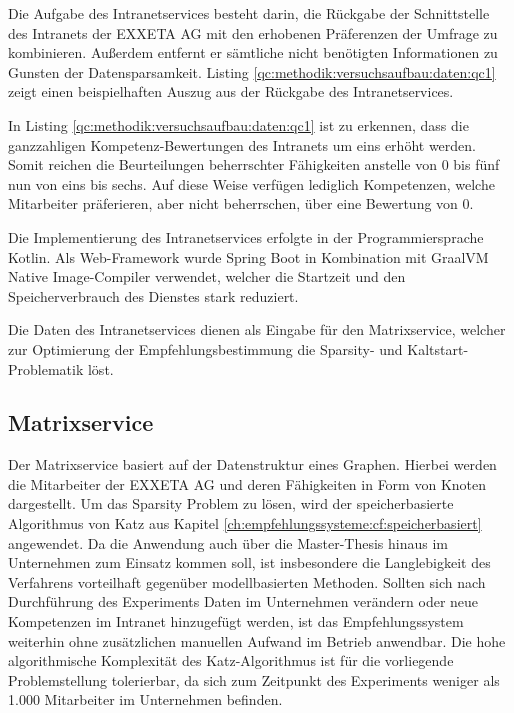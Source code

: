 Die Aufgabe des Intranetservices besteht darin, die Rückgabe der Schnittstelle des Intranets der EXXETA AG mit den erhobenen Präferenzen der Umfrage zu kombinieren. Außerdem entfernt er sämtliche nicht benötigten Informationen zu Gunsten der Datensparsamkeit. Listing \ref{qc:methodik:versuchsaufbau:daten:qc1} zeigt einen beispielhaften Auszug aus der Rückgabe des Intranetservices.



In Listing \ref{qc:methodik:versuchsaufbau:daten:qc1} ist zu erkennen, dass die ganzzahligen Kompetenz-Bewertungen des Intranets um eins erhöht werden. Somit reichen die Beurteilungen beherrschter Fähigkeiten anstelle von 0 bis fünf nun von eins bis sechs. Auf diese Weise verfügen lediglich Kompetenzen, welche Mitarbeiter präferieren, aber nicht beherrschen, über eine Bewertung von 0.

Die Implementierung des Intranetservices erfolgte in der Programmiersprache Kotlin. Als Web-Framework wurde Spring Boot in Kombination mit GraalVM Native Image-Compiler verwendet, welcher die Startzeit und den Speicherverbrauch des Dienstes stark reduziert.

Die Daten des Intranetservices dienen als Eingabe für den Matrixservice, welcher zur Optimierung der Empfehlungsbestimmung die Sparsity- und Kaltstart-Problematik löst.

\subsection{Matrixservice}
\label{ch:methodik:versuchsaufbau:systemarchitektur:matrixservice}
Der Matrixservice basiert auf der Datenstruktur eines Graphen. Hierbei werden die Mitarbeiter der EXXETA AG und deren Fähigkeiten in Form von Knoten dargestellt. Um das Sparsity Problem zu lösen, wird der speicherbasierte Algorithmus von Katz aus Kapitel \ref{ch:empfehlungssysteme:cf:speicherbasiert} angewendet. Da die Anwendung auch über die Master-Thesis hinaus im Unternehmen zum Einsatz kommen soll, ist insbesondere die Langlebigkeit des Verfahrens vorteilhaft gegenüber modellbasierten Methoden. Sollten sich nach Durchführung des Experiments Daten im Unternehmen verändern oder neue Kompetenzen im Intranet hinzugefügt werden, ist das Empfehlungssystem weiterhin ohne zusätzlichen manuellen Aufwand im Betrieb anwendbar. Die hohe algorithmische Komplexität des Katz-Algorithmus ist für die vorliegende Problemstellung tolerierbar, da sich zum Zeitpunkt des Experiments weniger als 1.000 Mitarbeiter im Unternehmen befinden.

